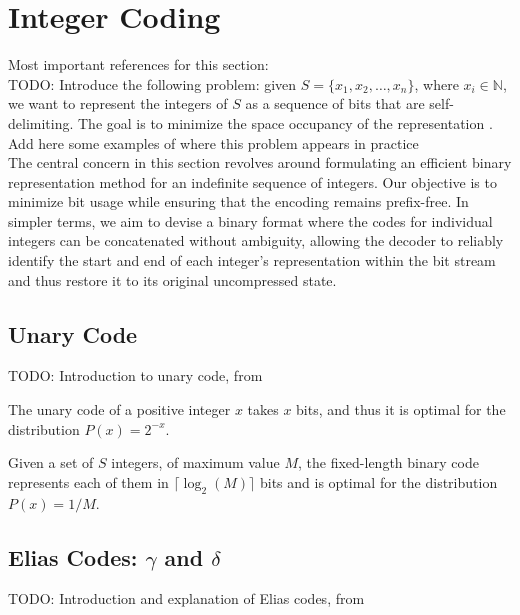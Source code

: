 \clearpage
\section{Integer Coding}

Most important references for this section: \cite{ferragina2023pearls,sayood2002lossless,navarro2016compact} \\

\noindent TODO: Introduce the following problem: given $S=\{x_1,x_2,\ldots,x_n\}$, where $x_i\in\mathbb{N}$, we want to represent the integers of $S$ as a sequence of bits that are self-delimiting. The goal is to minimize the space occupancy of the representation \cite{ferragina2023pearls}. Add here some examples of where this problem appears in practice \cite{witten1999managing} \\

\noindent The central concern in this section revolves around formulating an efficient binary representation method for an indefinite sequence of integers. Our objective is to minimize bit usage while ensuring that the encoding remains prefix-free. In simpler terms, we aim to devise a binary format where the codes for individual integers can be concatenated without ambiguity, allowing the decoder to reliably identify the start and end of each integer's representation within the bit stream and thus restore it to its original uncompressed state.

\subsection{Unary Code}
TODO: Introduction to unary code, from \cite{ferragina2023pearls,sayood2002lossless}

\begin{theorem}
    The unary code of a positive integer $x$ takes $x$ bits, and thus it is optimal for the distribution $P(x)=2^{-x}$. \cite{ferragina2023pearls}
\end{theorem}

\begin{theorem}
    Given a set of $S$ integers, of maximum value $M$, the fixed-length binary code represents each of them in $\lceil\log_2(M)\rceil$ bits and is optimal for the distribution $P(x)=1/M$. \cite{ferragina2023pearls}
\end{theorem}

\subsection{Elias Codes: $\gamma$ and $\delta$}
TODO: Introduction and explanation of Elias codes, from \cite{ferragina2023pearls,Elias1975}


